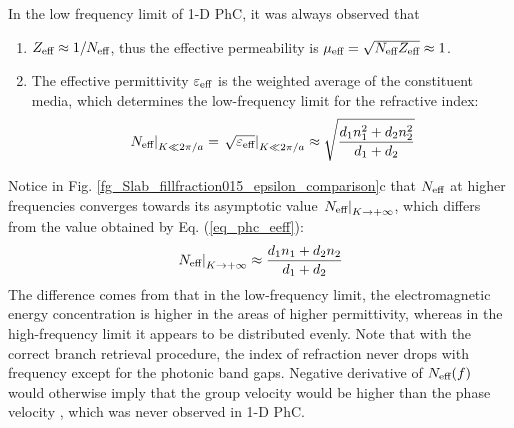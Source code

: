 In the low frequency limit of 1-D PhC, it was always observed that
\begin{enumerate}
\item{$Z_{\text{eff} } \approx 1/N_{\text{eff} }$, thus the effective permeability is $\mu_{\text{eff} } = \sqrt{N_{\text{eff} }Z_{\text{eff} }} \approx 1$.} 
\item{The effective permittivity $\varepsilon_{\text{eff} }$ is the weighted average of the constituent media, which determines the low-frequency limit for the refractive index:
	\begin{equation} \left.N_{\text{eff} }\right|_{K\ll 2\pi/a} =\left. \sqrt{\varepsilon_{\text{eff} }}\right|_{K\ll 2\pi/a} \approx \sqrt{\frac{d_1 n_1^{2} + d_2 n_2^{2}}{d_1+d_2}} \label{eq_phc_eeff}\end{equation}
	}
\end{enumerate}
Notice in Fig. \ref{fg_Slab_fillfraction015_epsilon_comparison}c that $N_{\text{eff} }$ at higher frequencies converges towards its asymptotic value $\left.N_{\text{eff} }\right|_{K\rightarrow +\infty}$, which differs from the value obtained by Eq. (\ref{eq_phc_eeff}):
\begin{equation} \left.N_{\text{eff} }\right|_{K\rightarrow +\infty} \approx \frac{d_1 n_1 + d_2 n_2}{d_1+d_2} \label{eq_phc_neff}\end{equation}
The difference comes from that in the low-frequency limit, the electromagnetic energy concentration is higher in the areas of higher permittivity, whereas in the high-frequency limit it appears to be distributed evenly.
Note that with the correct branch retrieval procedure, the index of refraction never drops with frequency except for the photonic band gaps. Negative derivative of $N_{\text{eff} }(f)$ would otherwise imply that the group velocity would be higher than the phase velocity \cite{mikki2009electromagnetic}, which was never observed in 1-D PhC.


